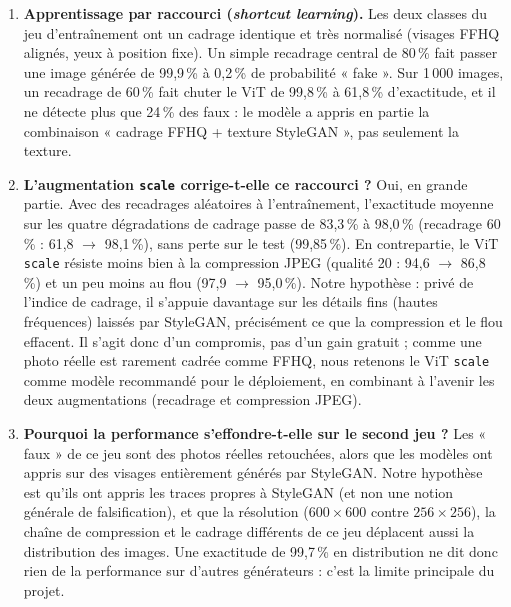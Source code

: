 \documentclass[11pt,a4paper]{article}
\begin{document}
\begin{enumerate}
        les yeux et la bouche. Sur 8 images, c'est une observation et non une preuve, mais elle est cohérente avec le point
        suivant : le modèle exploite aussi des indices qui ne sont pas propres au visage.
  \item \textbf{Apprentissage par raccourci (\emph{shortcut learning}).} Les deux classes du jeu d'entraînement ont un cadrage
        identique et très normalisé (visages FFHQ alignés, yeux à position fixe). Un simple recadrage central de 80\,\% fait
        passer une image générée de 99,9\,\% à 0,2\,\% de probabilité « fake ». Sur 1\,000 images, un recadrage de 60\,\% fait
        chuter le ViT de 99,8\,\% à 61,8\,\% d'exactitude, et il ne détecte plus que 24\,\% des faux : le modèle a appris en
        partie la combinaison « cadrage FFHQ + texture StyleGAN », pas seulement la texture.
  \item \textbf{L'augmentation \texttt{scale} corrige-t-elle ce raccourci ?} Oui, en grande partie. Avec des recadrages
        aléatoires à l'entraînement, l'exactitude moyenne sur les quatre dégradations de cadrage passe de 83,3\,\% à
        98,0\,\% (recadrage 60\,\% : 61,8 $\to$ 98,1\,\%), sans perte sur le test (99,85\,\%). En contrepartie, le ViT
        \texttt{scale} résiste moins bien à la compression JPEG (qualité 20 : 94,6 $\to$ 86,8\,\%) et un peu moins au flou
        (97,9 $\to$ 95,0\,\%). Notre hypothèse : privé de l'indice de cadrage, il s'appuie davantage sur les détails fins
        (hautes fréquences) laissés par StyleGAN, précisément ce que la compression et le flou effacent. Il s'agit donc
        d'un compromis, pas d'un gain gratuit ; comme une photo réelle est rarement cadrée comme FFHQ, nous retenons le
        ViT \texttt{scale} comme modèle recommandé pour le déploiement, en combinant à l'avenir les deux augmentations
        (recadrage et compression JPEG).
  \item \textbf{Pourquoi la performance s'effondre-t-elle sur le second jeu ?} Les « faux » de ce jeu sont des photos
        réelles retouchées, alors que les modèles ont appris sur des visages entièrement générés par StyleGAN. Notre
        hypothèse est qu'ils ont appris les traces propres à StyleGAN (et non une notion générale de falsification), et
        que la résolution ($600\times600$ contre $256\times256$), la chaîne de compression et le cadrage différents de ce
        jeu déplacent aussi la distribution des images. Une exactitude de 99,7\,\% en distribution ne dit donc rien de la
        performance sur d'autres générateurs : c'est la limite principale du projet.

\end{enumerate}
\end{document}
